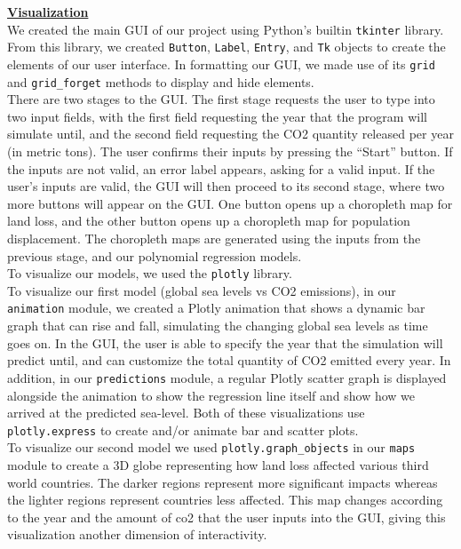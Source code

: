 \documentclass[fontsize=11pt]{article}
\begin{document}
\underline{\textbf{Visualization}}\\

We created the main GUI of our project using Python’s builtin \texttt{tkinter} library. From this library, we created \texttt{Button}, \texttt{Label}, \texttt{Entry}, and \texttt{Tk} objects to create the elements of our user interface. In formatting our GUI, we made use of its \texttt{grid} and \texttt{grid\_forget} methods to display and hide elements.\\

There are two stages to the GUI. The first stage requests the user to type into two input fields, with the first field requesting the year that the program will simulate until, and the second field requesting the CO2 quantity released per year (in metric tons). The user confirms their inputs by pressing the “Start” button. If the inputs are not valid, an error label appears, asking for a valid input. If the user’s inputs are valid, the GUI will then proceed to its second stage, where two more buttons will appear on the GUI. One button opens up a choropleth map for land loss, and the other button opens up a choropleth map for population displacement. The choropleth maps are generated using the inputs from the previous stage, and our polynomial regression models. \\

To visualize our models, we used the \texttt{plotly} library. \\

To visualize our first model (global sea levels vs CO2 emissions), in our \texttt{animation} module, we created a Plotly animation that shows a dynamic bar graph that can rise and fall, simulating the changing global sea levels as time goes on. In the GUI, the user is able to specify the year that the simulation will predict until, and can customize the total quantity of CO2 emitted every year. In addition, in our \texttt{predictions} module, a regular Plotly scatter graph is displayed alongside the animation to show the regression line itself and show how we arrived at the predicted sea-level. Both of these visualizations use \texttt{plotly.express} to create and/or animate bar and scatter plots.\\

To visualize our second model we used \texttt{plotly.graph\_objects} in our \texttt{maps} module to create a 3D globe representing how land loss affected various third world countries. The darker regions represent more significant impacts whereas the lighter regions represent countries less affected. This map changes according to the year and the amount of co2 that the user inputs into the GUI, giving this visualization another dimension of interactivity.\\
\end{document}
